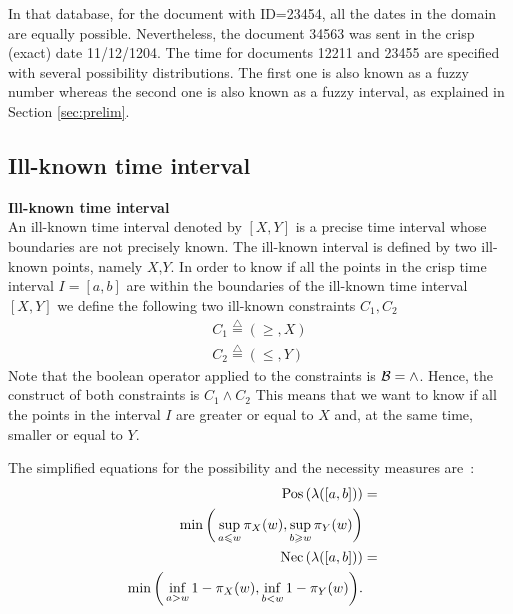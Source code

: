 In that database, for the document with ID=23454, all the dates in the domain are equally possible. Nevertheless, the document 34563 was sent in the crisp (exact) date 11/12/1204. The time for documents 12211 and 23455 are specified with several possibility distributions. The first one is also known as a fuzzy number whereas the second one is also known as a fuzzy interval, as explained in Section \ref{sec:prelim}.
 
 
 


\subsection{\label{subsec:ill-known-interval}Ill-known time interval}


\begin{definition}
\textbf{Ill-known time interval}\\
An ill-known time interval denoted by $\left[X, Y\right]$ is a precise time interval whose boundaries are not precisely known. The ill-known interval is defined by two ill-known points, namely $X$,$Y$.
In order to know if all the points in the crisp time interval $I=\left[a, b\right]$ are within the boundaries of the ill-known time interval $\left[X, Y\right]$ we define the following two ill-known constraints $C_{1}, C_{2}$ 
\begin{eqnarray}
\label{eq:constraint-c1}
C_1\stackrel{\triangle}{=}\left(\geq,X\right)  \\
\label{eq:constraint-c2}
C_2\stackrel{\triangle}{=}\left(\leq,Y\right)
\end{eqnarray}
Note that the boolean operator applied to the constraints is $\operatorname*{\mathcal{B}}=\wedge$. Hence, the construct of both constraints is $C_1 \wedge C_2$
This means that we want to know if all the points in the interval $I$ are greater or equal to $X$ and, at the same time, smaller or equal to $Y$.
\end{definition}

The simplified equations for the possibility and the necessity measures are~\cite{Pons2011}:
\begin{eqnarray}
\label{eq:interval-pos}
\operatorname{Pos}\left(\lambda([a,b])\right)&=&\\
\nonumber
\min\bigg(\sup_{a\leqslant w}\pi_{X}(w),\sup_{b\geqslant w}\pi_{Y}(w)\bigg)\\
\label{eq:interval-nec}
\operatorname{Nec}\left(\lambda([a,b])\right)&=&\\
\nonumber
\min\bigg(\inf_{a>w}1-\pi_{X}(w),\inf_{b<w}1-\pi_{Y}(w)\bigg).
\end{eqnarray}





